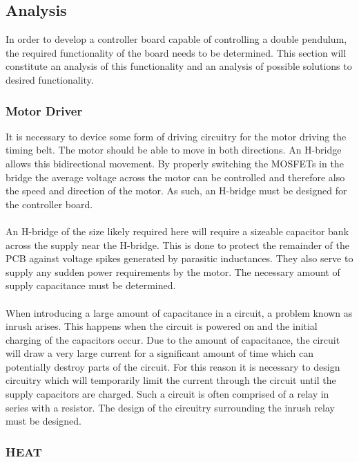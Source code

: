 \subsection{Analysis}
\label{sub:controller_board_analysis}

In order to develop a controller board capable of controlling a double pendulum, the required functionality of the board needs to be determined. 
This section will constitute an analysis of this functionality and an analysis of possible solutions to desired functionality.

\subsubsection{Motor Driver}
It is necessary to device some form of driving circuitry for the motor driving the timing belt.
The motor should be able to move in both directions. 
An H-bridge allows this bidirectional movement.
By properly switching the MOSFETs in the bridge the average voltage across the motor can be controlled and therefore also the speed and direction of the motor.
As such, an H-bridge must be designed for the controller board.
\\~\\
An H-bridge of the size likely required here will require a sizeable capacitor bank across the supply near the H-bridge.
This is done to protect the remainder of the PCB against voltage spikes generated by parasitic inductances. 
They also serve to supply any sudden power requirements by the motor.
The necessary amount of supply capacitance must be determined.
\\~\\
When introducing a large amount of capacitance in a circuit, a problem known as inrush arises.
This happens when the circuit is powered on and the initial charging of the capacitors occur.
Due to the amount of capacitance, the circuit will draw a very large current for a significant amount of time which can potentially destroy parts of the circuit.
For this reason it is necessary to design circuitry which will temporarily limit the current through the circuit until the supply capacitors are charged.
Such a circuit is often comprised of a relay in series with a resistor.
The design of the circuitry surrounding the inrush relay must be designed.

\subsubsection{HEAT}

